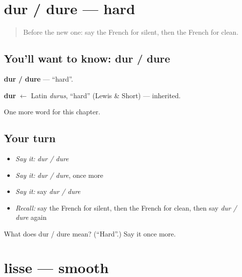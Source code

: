 \section[dur / dure]{dur / dure — hard}

\label{lesson:FR-C244-dur-dure}



\begin{quote}
Before the new one: say the French for silent, then the French for clean.
\end{quote}

\subsection*{You'll want to know: dur / dure}
\textbf{dur / dure} — \textquotedblleft{}hard\textquotedblright{}.

\begin{cousinweb}
\textbf{dur} $\leftarrow$ Latin \emph{durus}, \textquotedblleft{}hard\textquotedblright{} (Lewis \& Short) — inherited.
\end{cousinweb}

\begin{grammarlens}[title={What you've built}]
One more word for this chapter.
\end{grammarlens}

\subsection*{Your turn}
\begin{itemize}
\raggedright
  \item \emph{Say it:} \emph{dur / dure}
  \item \emph{Say it:} \emph{dur / dure}, once more
  \item \emph{Say it:} say \emph{dur / dure}
  \item \emph{Recall:} say the French for silent, then the French for clean, then say \emph{dur / dure} again
\end{itemize}

\begin{tcolorbox}[breakable,colback=teal!4,colframe=teal!35!black,title={Before you move on}]
What does dur / dure mean? (\textquotedblleft{}Hard\textquotedblright{}.) Say it once more.
\end{tcolorbox}
\section[lisse]{lisse — smooth}

